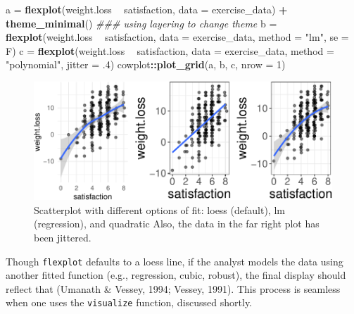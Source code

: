 \documentclass[
  doc]{apa6}
\newenvironment{Shaded}{\begin{snugshade}}{\end{snugshade}}
\newcommand{\CommentTok}[1]{\textcolor[rgb]{0.56,0.35,0.01}{\textit{#1}}}
\newcommand{\DataTypeTok}[1]{\textcolor[rgb]{0.13,0.29,0.53}{#1}}
\newcommand{\DecValTok}[1]{\textcolor[rgb]{0.00,0.00,0.81}{#1}}
\newcommand{\FloatTok}[1]{\textcolor[rgb]{0.00,0.00,0.81}{#1}}
\newcommand{\KeywordTok}[1]{\textcolor[rgb]{0.13,0.29,0.53}{\textbf{#1}}}
\newcommand{\NormalTok}[1]{#1}
\newcommand{\OperatorTok}[1]{\textcolor[rgb]{0.81,0.36,0.00}{\textbf{#1}}}
\newcommand{\StringTok}[1]{\textcolor[rgb]{0.31,0.60,0.02}{#1}}
\begin{document}
\begin{Shaded}
\begin{Highlighting}[]
\NormalTok{a =}\StringTok{ }\KeywordTok{flexplot}\NormalTok{(weight.loss }\OperatorTok{~}\StringTok{ }\NormalTok{satisfaction, }\DataTypeTok{data =}\NormalTok{ exercise_data) }\OperatorTok{+}\StringTok{ }
\StringTok{  }\KeywordTok{theme_minimal}\NormalTok{() }\CommentTok{### using layering to change theme}
\NormalTok{b =}\StringTok{ }\KeywordTok{flexplot}\NormalTok{(weight.loss }\OperatorTok{~}\StringTok{ }\NormalTok{satisfaction, }\DataTypeTok{data =}\NormalTok{ exercise_data, }
             \DataTypeTok{method =} \StringTok{"lm"}\NormalTok{, }\DataTypeTok{se =}\NormalTok{ F)}
\NormalTok{c =}\StringTok{ }\KeywordTok{flexplot}\NormalTok{(weight.loss }\OperatorTok{~}\StringTok{ }\NormalTok{satisfaction, }\DataTypeTok{data =}\NormalTok{ exercise_data, }
             \DataTypeTok{method =} \StringTok{"polynomial"}\NormalTok{, }\DataTypeTok{jitter =} \FloatTok{.4}\NormalTok{)}
\NormalTok{cowplot}\OperatorTok{::}\KeywordTok{plot_grid}\NormalTok{(a, b, c, }\DataTypeTok{nrow =} \DecValTok{1}\NormalTok{)}
\end{Highlighting}
\end{Shaded}

\begin{figure}

{\centering \includegraphics[width=0.9\linewidth]{flexplot_psychmeth_files/figure-latex/unnamed-chunk-5-1} 

}

\caption{Scatterplot with different options of fit: loess (default), lm (regression), and quadratic Also, the data in the far right plot has been jittered. }\label{fig:unnamed-chunk-5}
\end{figure}

Though \texttt{flexplot} defaults to a loess line, if the analyst models the data using another fitted function (e.g., regression, cubic, robust), the final display should reflect that (Umanath \& Vessey, 1994; Vessey, 1991). This process is seamless when one uses the \texttt{visualize} function, discussed shortly.
\end{document}

